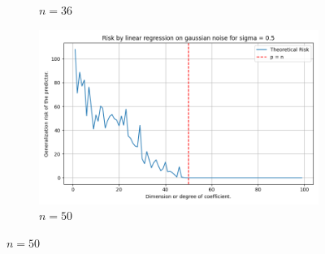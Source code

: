 \documentclass{article}
\begin{document}
\begin{figure}[htb]
\begin{subfigure}[b]{\imgwidth}
    \caption{$n=36$}\label{fig:1c21}
  \end{subfigure}%
  \hfill
  \begin{subfigure}[b]{\imgwidth}
    \includegraphics[width=\linewidth]{img/descent_devel_t4.png}
    \caption{$n=50$}\label{fig:1d21}
  \end{subfigure}

  \medskip


\end{figure}
\end{document}
